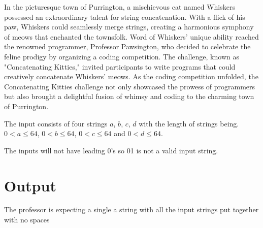 In the picturesque town of Purrington, a mischievous cat named Whiskers possessed an extraordinary talent for string concatenation. With a flick of his paw, Whiskers could seamlessly merge strings, creating a harmonious symphony of meows that enchanted the townsfolk.
\noindent
Word of Whiskers' unique ability reached the renowned programmer, Professor Pawsington, who decided to celebrate the feline prodigy by organizing a coding competition. The challenge, known as "Concatenating Kitties," invited participants to write programs that could creatively concatenate Whiskers' meows. As the coding competition unfolded, the Concatenating Kitties challenge not only showcased the prowess of programmers but also brought a delightful fusion of whimsy and coding to the charming town of Purrington.

\begin{Input}
The input consists of four strings $a$, $b$, $c$, $d$ with the length of strings being.
\noindent
$0 < a\leq 64$,
$0 < b\leq 64$, 
$0 < c\leq 64$ and
$0 < d\leq 64$.

\noindent
The inputs will not have leading 0's so 01 is not a valid input string.
\end{Input}

\section*{Output}
The professor is expecting a single a string with all the input strings put together with no spaces
